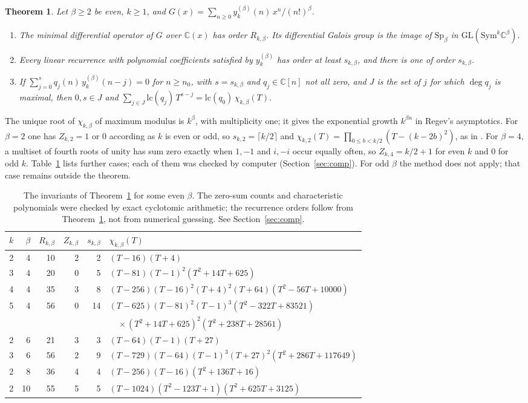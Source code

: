 \documentclass[11pt]{amsart}
\newtheorem{theorem}{Theorem}
\theoremstyle{definition}
\newcommand{\C}{\mathbb C}
\newcommand{\GL}{\mathrm{GL}}
\newcommand{\Sp}{\mathrm{Sp}}
\newcommand{\Sym}{\mathrm{Sym}}
\newcommand{\lc}{\mathrm{lc}}
\begin{document}
\begin{theorem}\label{thm:B}
Let $\beta\ge2$ be even, $k\ge1$, and $G(x)=\sum_{n\ge0}y^{(\beta)}_k(n)\,x^n/(n!)^\beta$.
\begin{enumerate}[label=\textup{(\roman*)}]
\item The minimal differential operator of $G$ over $\C(x)$ has order $R_{k,\beta}$. Its differential Galois group is the image of $\Sp_\beta$ in $\GL(\Sym^k\C^\beta)$.
\item Every linear recurrence with polynomial coefficients satisfied by $y^{(\beta)}_k$ has order at least $s_{k,\beta}$, and there is one of order $s_{k,\beta}$.
\item If $\sum_{j=0}^{s}q_j(n)\,y^{(\beta)}_k(n-j)=0$ for $n\ge n_0$, with $s=s_{k,\beta}$ and $q_j\in\C[n]$ not all zero, and $J$ is the set of $j$ for which $\deg q_j$ is maximal, then $0,s\in J$ and $\sum_{j\in J}\lc(q_j)\,T^{s-j}=\lc(q_0)\,\chi_{k,\beta}(T)$.
\end{enumerate}
\end{theorem}

The unique root of $\chi_{k,\beta}$ of maximum modulus is $k^\beta$, with multiplicity one; it gives the exponential growth $k^{\beta n}$ in Regev's asymptotics. For $\beta=2$ one has $Z_{k,2}=1$ or $0$ according as $k$ is even or odd, so $s_{k,2}=\lceil k/2\rceil$ and $\chi_{k,2}(T)=\prod_{0\le b<k/2}(T-(k-2b)^2)$, as in \cite{BFK95,KBT}. For $\beta=4$, a multiset of fourth roots of unity has sum zero exactly when $1,-1$ and $i,-i$ occur equally often, so $Z_{k,4}=k/2+1$ for even $k$ and $0$ for odd $k$. Table~\ref{tab:regev} lists further cases; each of them was checked by computer (Section~\ref{sec:comp}). For odd $\beta$ the method does not apply; that case remains outside the theorem.

\begin{table}[ht]
\centering
\small
\begin{tabular}{@{}rrrrrl@{}}
\toprule
$k$&$\beta$&$R_{k,\beta}$&$Z_{k,\beta}$&$s_{k,\beta}$&$\chi_{k,\beta}(T)$\\
\midrule
2&4&10&2&2&$(T-16)(T+4)$\\
3&4&20&0&5&$(T-81)(T-1)^2(T^2+14T+625)$\\
4&4&35&3&8&$(T-256)(T-16)^2(T+4)^2(T+64)(T^2-56T+10000)$\\
5&4&56&0&14&$(T-625)(T-81)^2(T-1)^3(T^2-322T+83521)$\\
&&&&&$\quad\times(T^2+14T+625)^2(T^2+238T+28561)$\\
2&6&21&3&3&$(T-64)(T-1)(T+27)$\\
3&6&56&2&9&$(T-729)(T-64)(T-1)^3(T+27)^2(T^2+286T+117649)$\\
2&8&36&4&4&$(T-256)(T-16)(T^2+136T+16)$\\
2&10&55&5&5&$(T-1024)(T^2-123T+1)(T^2+625T+3125)$\\
\bottomrule
\end{tabular}
\caption{The invariants of Theorem~\ref{thm:B} for some even $\beta$. The zero-sum counts and characteristic polynomials were checked by exact cyclotomic arithmetic; the recurrence orders follow from Theorem~\ref{thm:B}, not from numerical guessing. See Section~\ref{sec:comp}.}\label{tab:regev}
\end{table}
\end{document}

